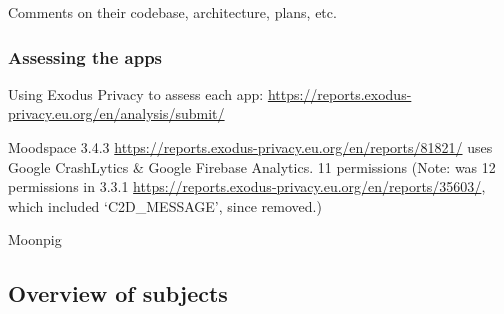Comments on their codebase, architecture, plans, etc.

\subsubsection{Assessing the apps}
Using Exodus Privacy to assess each app: \url{https://reports.exodus-privacy.eu.org/en/analysis/submit/}

Moodspace 3.4.3 \url{https://reports.exodus-privacy.eu.org/en/reports/81821/}
 uses Google CrashLytics \& Google Firebase Analytics. 11 permissions (Note: was 12 permissions in 3.3.1 \url{https://reports.exodus-privacy.eu.org/en/reports/35603/}, which included `C2D\_MESSAGE', since removed.)
 
Moonpig  \url{} 
\subsection{Overview of subjects}

